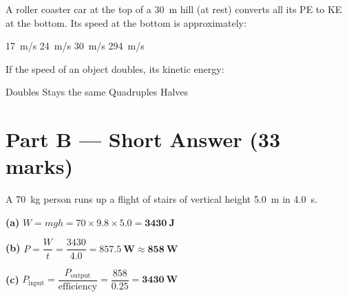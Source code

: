 \documentclass[addpoints]{exam}
\begin{document}
\begin{questions}
\question[1] A roller coaster car at the top of a \SI{30}{m} hill (at rest) converts all
its PE to KE at the bottom. Its speed at the bottom is approximately:
\begin{choices}
    \choice \SI{17}{m/s}
    \correctchoice \SI{24}{m/s}
    \choice \SI{30}{m/s}
    \choice \SI{294}{m/s}
\end{choices}

\question[1] If the speed of an object doubles, its kinetic energy:
\begin{choices}
    \choice Doubles
    \choice Stays the same
    \correctchoice Quadruples
    \choice Halves
\end{choices}


\section*{Part B --- Short Answer (33 marks)}

\question A \SI{70}{kg} person runs up a flight of stairs of vertical height \SI{5.0}{m}
in \SI{4.0}{s}.
\begin{solution}[9cm]
\textbf{(a)} $W = mgh = 70 \times 9.8 \times 5.0 = \mathbf{\SI{3430}{J}}$

\textbf{(b)} $P = \dfrac{W}{t} = \dfrac{3430}{4.0} = \mathbf{\SI{857.5}{W} \approx \SI{858}{W}}$

\textbf{(c)} $P_\text{input} = \dfrac{P_\text{output}}{\text{efficiency}} = \dfrac{858}{0.25}
= \mathbf{\SI{3430}{W}}$


\end{solution}
\end{questions}
\end{document}
